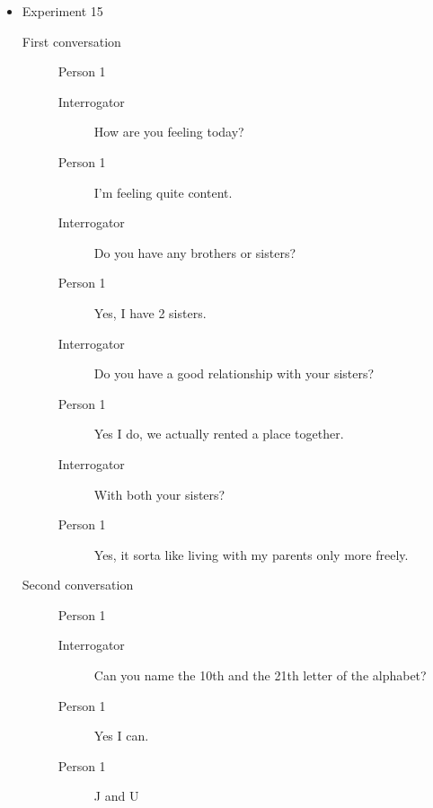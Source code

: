 \begin{itemize}
   \item Experiment 15
      \begin{description}
         \item [First conversation] Person 1
            \begin{description}
               \item [Interrogator] How are you feeling today?
               \item [Person 1] I'm feeling quite content.
               \item [Interrogator] Do you have any brothers or sisters?
               \item [Person 1] Yes, I have 2 sisters.
               \item [Interrogator] Do you have a good relationship with your sisters?
               \item [Person 1] Yes I do, we actually rented a place together.
               \item [Interrogator] With both your sisters?
               \item [Person 1] Yes, it sorta like living with my parents only more freely.
            \end{description}
         \item [Second conversation] Person 1
            \begin{description}
               \item [Interrogator] Can you name the 10th and the 21th letter of the alphabet?
               \item [Person 1] Yes I can.
               \item [Person 1] J and U
            \end{description}
      \end{description}


\end{itemize}
